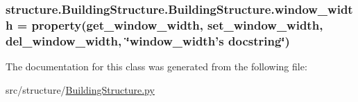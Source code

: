 \hypertarget{classstructure_1_1_building_structure_1_1_building_structure_aa663233e96c2b828e0c7b6bf3708f60c}{
\subsubsection[{window\-\_\-width}]{\setlength{\rightskip}{0pt plus 5cm}structure.\-Building\-Structure.\-Building\-Structure.\-window\-\_\-width = property({\bf get\-\_\-window\-\_\-width}, {\bf set\-\_\-window\-\_\-width}, {\bf del\-\_\-window\-\_\-width}, \char`\"{}window\-\_\-width's docstring\char`\"{})\hspace{0.3cm}{\ttfamily [static]}}}\label{classstructure_1_1_building_structure_1_1_building_structure_aa663233e96c2b828e0c7b6bf3708f60c}


The documentation for this class was generated from the following file\-:\begin{DoxyCompactItemize}
\item 
src/structure/\hyperlink{_building_structure_8py}{Building\-Structure.\-py}\end{DoxyCompactItemize}
